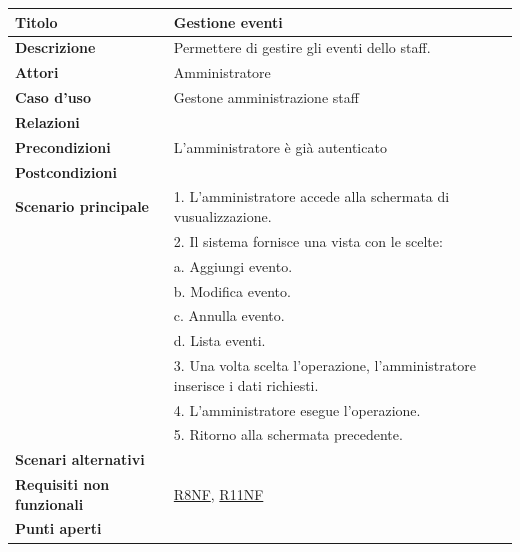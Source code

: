 \documentclass[a4paper]{article}
\begin{document}
\begin{center}
\begin{tabularx}{1\textwidth}{|l|X|}
    \hline
	\textbf{Titolo} & Gestione eventi \\
	\hline
	\textbf{Descrizione} & Permettere di gestire gli eventi dello staff. \\
	\hline
	\textbf{Attori} & Amministratore \\
	\hline
	\textbf{Caso d'uso} & Gestone amministrazione staff \\
	\hline
	\textbf{Relazioni} &  \\
	\hline
	\textbf{Precondizioni} & L'amministratore è già autenticato \\
	\hline
	\textbf{Postcondizioni} &  \\
	\hline
	\textbf{Scenario principale} & 1. L'amministratore accede alla schermata di vusualizzazione. \\
								 & 2. Il sistema fornisce una vista con le scelte: \\
								 & \quad a. Aggiungi evento.\\
								 & \quad b. Modifica evento.\\
								 & \quad c. Annulla evento.\\
								 & \quad d. Lista eventi.\\
								 & 3. Una volta scelta l'operazione, l'amministratore inserisce i dati richiesti. \\
								 & 4. L'amministratore esegue l'operazione.\\
								 & 5. Ritorno alla schermata precedente.\\
	\hline
	\textbf{Scenari alternativi} & \\
	\hline
	\textbf{Requisiti non funzionali} & \hyperlink{R8NF}{R8NF}, \hyperlink{R11NF}{R11NF} \\
	\hline
	\textbf{Punti aperti} & \\
	\hline
\end{tabularx}
\end{center}

\end{document}
